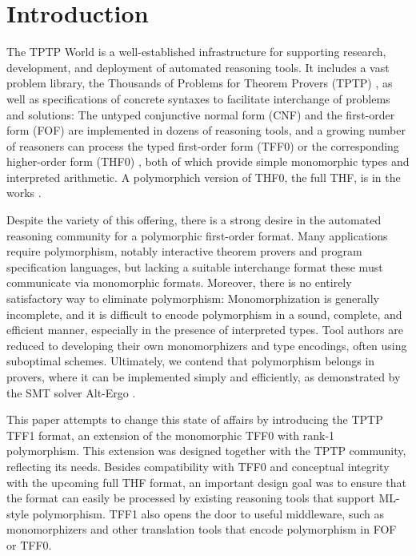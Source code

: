 \section{Introduction}
\label{sec_intro}

The TPTP World \cite{sutcliffe-2010-world} is a well-established infrastructure
for supporting research, development, and deployment of automated reasoning
tools. It includes a vast problem library, the Thousands of Problems for Theorem
Provers (TPTP) \cite{sutcliffe-2009-lib}, as well as specifications of concrete
syntaxes to facilitate interchange of problems and solutions: The untyped
conjunctive normal form (CNF) and the first-order form (FOF) are implemented in
dozens of reasoning tools, and a growing number of reasoners can process the
typed first-order form (TFF0) \cite{TFF0} or the corresponding higher-order form
(THF0) \cite{benzmueller-et-al-2008-thf0}, both of which provide simple
monomorphic types and interpreted arithmetic. A polymorphich version of THF0,
the full THF, is in the works \cite{sutcliffe-benzmueller-2010}.

Despite the variety of this offering, there is a strong desire in the automated
reasoning community for a polymorphic first-order format. Many applications
require polymorphism, notably interactive theorem provers and program
specification languages, but lacking a suitable interchange format these
must communicate via monomorphic formats. Moreover, there is no entirely
satisfactory way to eliminate polymorphism: Monomorphization is generally
incomplete, and it is difficult to encode polymorphism in a sound, complete, and
efficient manner, especially in the presence of interpreted types. Tool authors
are reduced to developing their own monomorphizers and type encodings, often
using suboptimal schemes. Ultimately, we contend that polymorphism belongs in
provers, where it can be implemented simply and efficiently, as demonstrated by
the SMT solver Alt-Ergo \cite{bobot-et-al-2008}.

This paper attempts to change this state of affairs by introducing the TPTP TFF1
format, an extension of the monomorphic TFF0 with rank-1 polymorphism. This
extension was designed together with the TPTP community, reflecting its needs.
Besides compatibility with TFF0 and conceptual integrity with the upcoming full
THF format, an important design goal was to ensure that the format can easily be
processed by existing reasoning tools that support ML-style polymorphism. TFF1
also opens the door to useful middleware, such as monomorphizers and other
translation tools that encode polymorphism in FOF or TFF0.

